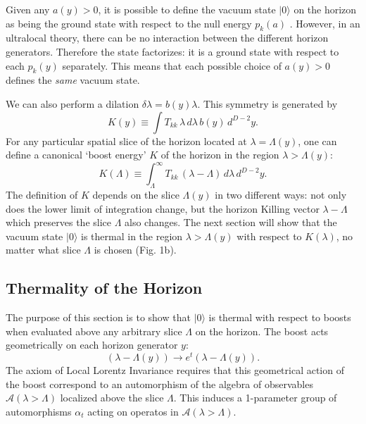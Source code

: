 \documentclass[12pt]{article}
\begin{document}
Given any $a(y) > 0$, it is possible to define the vacuum state $|0\rangle$ on the horizon as being the ground state with respect to the null energy $p_k(a)$ \cite{sewell82}.  However, in an ultralocal theory, there can be no interaction between the different horizon generators.  Therefore the state factorizes: it is a ground state with respect to each $p_k(y)$ separately.  This means that each possible choice of $a(y) > 0$ defines the \emph{same} vacuum state.

We can also perform a dilation $\delta \lambda = b(y)\lambda$.  This symmetry is generated by
\begin{equation}
K(y) \equiv \int T_{kk}\,\lambda\,d\lambda\,b(y)\,d^{D-2}y.
\end{equation}
For any particular spatial slice of the horizon located at $\lambda = \Lambda(y)$, one can define a canonical `boost energy' $K$ of the horizon in the region $\lambda > \Lambda(y)$:
\begin{equation}\label{modular}
K(\Lambda) \equiv \int_\Lambda^\infty T_{kk}\,(\lambda - \Lambda) \,d\lambda\,d^{D-2}y.
\end{equation}
The definition of $K$ depends on the slice $\Lambda(y)$ in two different ways: not only does the lower limit of integration change, but the horizon Killing vector $\lambda - \Lambda$ which preserves the slice $\Lambda$ also changes.  The next section will show that the vacuum state $|0\rangle$ is thermal in the region $\lambda > \Lambda(y)$ with respect to $K(\lambda)$, no matter what slice $\Lambda$ is chosen (Fig. 1b).

\subsection{Thermality of the Horizon}\label{thermal}

The purpose of this section is to show that $|0\rangle$ is thermal with respect to boosts when evaluated above any arbitrary slice $\Lambda$ on the horizon.  The boost acts geometrically on each horizon generator $y$:
\begin{equation}
(\lambda - \Lambda(y)) \to e^{t} (\lambda - \Lambda(y)).
\end{equation}
The axiom of Local Lorentz Invariance requires that this geometrical action of the boost correspond to an automorphism of the algebra of observables $\mathcal{A}(\lambda > \Lambda)$ localized above the slice $\Lambda$.  This induces a 1-parameter group of automorphisms $\alpha_t$ acting on operatos in $\mathcal{A}(\lambda > \Lambda)$.
\end{document}
